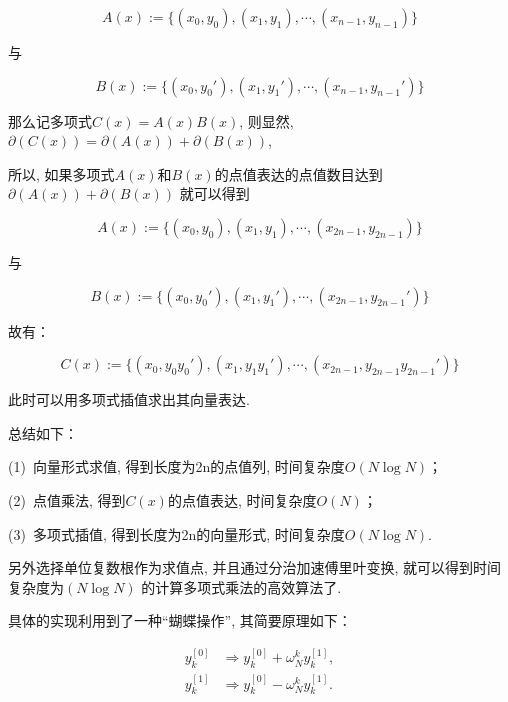 \begin{equation}
A(x) := \{(x_0, y_0), (x_1, y_1), \cdots , (x_{n - 1}, y_{n - 1})\}
\end{equation}

与

\begin{equation}
B(x) := \{(x_0, {y_0}'), (x_1, {y_1}'), \cdots , (x_{n - 1}, {y_{n - 1}}')\}
\end{equation}

那么记多项式$C(x) = A(x)B(x)$, 则显然, $\partial (C(x)) = \partial (A(x)) + \partial (B(x))$, 

所以, 如果多项式$A(x)$和$B(x)$的点值表达的点值数目达到$\partial (A(x)) + \partial (B(x))$
就可以得到

\begin{equation}
A(x) := \{(x_0, y_0), (x_1, y_1), \cdots , (x_{2n - 1}, y_{2n - 1})\}
\end{equation}

与

\begin{equation}
B(x) := \{(x_0, {y_0}'), (x_1, {y_1}'), \cdots , (x_{2n - 1}, {y_{2n - 1}}')\}
\end{equation}

故有：

\begin{equation}
C(x) := \{(x_0, y_0{y_0}'), (x_1, y_1{y_1}'), \cdots , (x_{2n - 1}, y_{2n - 1}{y_{2n - 1}}')\}
\end{equation}

此时可以用多项式插值求出其向量表达.

总结如下：

(1)\ 向量形式求值, 得到长度为2n的点值列, 时间复杂度$O(N \log N)$；

(2)\ 点值乘法, 得到$C(x)$的点值表达, 时间复杂度$O(N)$；

(3)\ 多项式插值, 得到长度为2n的向量形式, 时间复杂度$O(N \log N)$.

另外选择单位复数根作为求值点, 并且通过分治加速傅里叶变换, 就可以得到时间复杂度为$(N\log N)$
的计算多项式乘法的高效算法了.

具体的实现利用到了一种“蝴蝶操作”, 其简要原理如下：

\begin{equation}
\begin{aligned}
y_{k}^{[0]} &\Rightarrow y_{k}^{[0]} + \omega ^{k}_{N}y_{k}^{[1]},\\
y_{k}^{[1]} &\Rightarrow y_{k}^{[0]} - \omega ^{k}_{N}y_{k}^{[1]}.\\
\end{aligned}
\end{equation}

